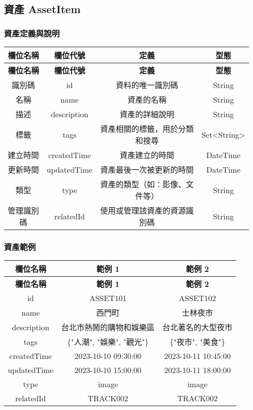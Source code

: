 \subsection{資產 AssetItem}

\subsubsection{資產定義與說明}

\begin{longtable}{|c|c|c|c|}
  \hline
  \textbf{欄位名稱} & \textbf{欄位代號} & \textbf{定義} &\textbf{型態} \\
  \hline
  \endfirsthead
  \hline
  \textbf{欄位名稱} & \textbf{欄位代號} & \textbf{定義} &\textbf{型態} \\
  \hline
  \endhead
  識別碼 & id & 資料的唯一識別碼 & String \\
  \hline
  名稱 & name & 資產的名稱 & String \\
  \hline
  描述 & description & 資產的詳細說明 & String \\
  \hline
  標籤 & tags & 資產相關的標籤，用於分類和搜尋 & Set<String> \\
  \hline
  建立時間 & createdTime & 資產建立的時間 & DateTime \\
  \hline
  更新時間 & updatedTime & 資產最後一次被更新的時間 & DateTime \\
  \hline
  類型 & type & 資產的類型（如：影像、文件等） & String \\
  \hline
  管理識別碼 & relatedId & 使用或管理該資產的資源識別碼 & String \\
  \hline
\end{longtable}

\subsubsection{資產範例}

\begin{longtable}{|c|c|c|}
  \hline
  \textbf{欄位名稱} & \textbf{範例 1} & \textbf{範例 2} \\
  \hline
  \endfirsthead
  \hline
  \textbf{欄位名稱} & \textbf{範例 1} & \textbf{範例 2} \\
  \hline
  \endhead
  
  id & ASSET101 & ASSET102 \\
  \hline
  name & 西門町 & 士林夜市 \\
  \hline
  description & 台北市熱鬧的購物和娛樂區 & 台北著名的大型夜市 \\
  \hline
  tags & \{"人潮", "娛樂", "觀光"\} & \{"夜市", "美食"\} \\
  \hline
  createdTime & 2023-10-10 09:30:00 & 2023-10-11 10:45:00 \\
  \hline
  updatedTime & 2023-10-10 15:00:00 & 2023-10-11 18:00:00 \\
  \hline
  type & image & image \\
  \hline
  relatedId & TRACK002 & TRACK002 \\
  \hline
\end{longtable}
